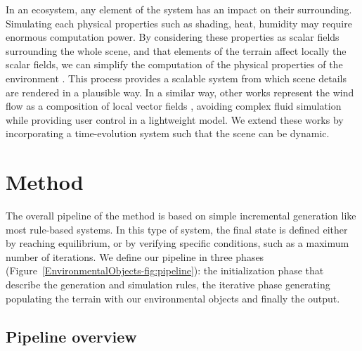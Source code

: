 In an ecosystem, any element of the system has an impact on their surrounding. Simulating each physical properties such as shading, heat, humidity may require enormous computation power. By considering these properties as scalar fields surrounding the whole scene, and that elements of the terrain affect locally the scalar fields, we can simplify the computation of the physical properties of the environment \cite{Grosbellet2016, Guerin2016a}. This process provides a scalable system from which scene details are rendered in a plausible way. In a similar way, other works represent the wind flow as a composition of local vector fields \cite{Wejchert1991}, avoiding complex fluid simulation while providing user control in a lightweight model. We extend these works by incorporating a time-evolution system such that the scene can be dynamic.


\section{Method}
\label{EnvironmentObjects-sec:method}
The overall pipeline of the method is based on simple incremental generation like most rule-based systems. In this type of system, the final state is defined either by reaching equilibrium, or by verifying specific conditions, such as a maximum number of iterations. 
We define our pipeline in three phases (Figure~\ref{EnvironmentalObjects-fig:pipeline}): the initialization phase that describe the generation and simulation rules, the iterative phase generating populating the terrain with our environmental objects and finally the output.


\subsection{Pipeline overview}
\label{EnvironmentObjects-sec:pipeline}

